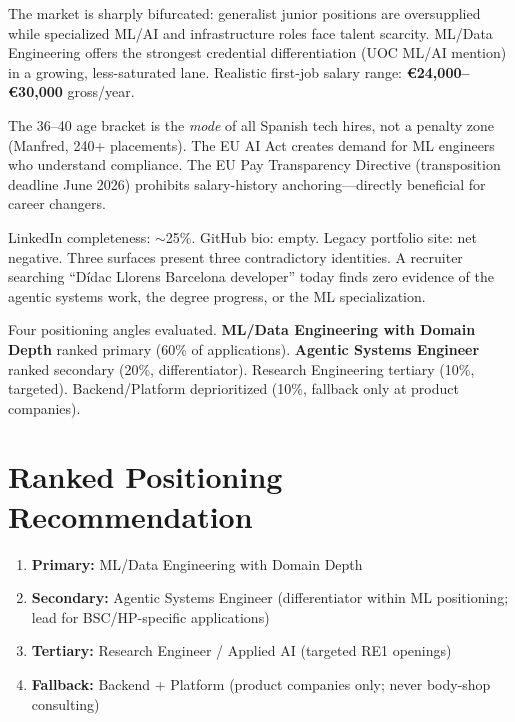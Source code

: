 \documentclass[a4paper,11pt,openany]{report}
\begin{document}
\begin{description}[style=nextline]
  \item[T1 --- Barcelona IT Job Market]
    The market is sharply bifurcated: generalist junior positions are
    oversupplied while specialized ML/AI and infrastructure roles face talent
    scarcity. ML/Data Engineering offers the strongest credential
    differentiation (UOC ML/AI mention) in a growing, less-saturated lane.
    Realistic first-job salary range: \textbf{€24,000--€30,000} gross/year.

  \item[T2 --- Social, Press \& Legal Landscape]
    The 36--40 age bracket is the \emph{mode} of all Spanish tech hires, not a
    penalty zone (Manfred, 240+ placements). The EU AI Act creates demand for
    ML engineers who understand compliance. The EU Pay Transparency Directive
    (transposition deadline June 2026) prohibits salary-history anchoring---directly
    beneficial for career changers.

  \item[T3 --- Profile Audit]
    LinkedIn completeness: $\sim$25\%. GitHub bio: empty. Legacy portfolio
    site: net negative. Three surfaces present three contradictory identities.
    A recruiter searching ``Dídac Llorens Barcelona developer'' today finds
    zero evidence of the agentic systems work, the degree progress, or the ML
    specialization.

  \item[T4 --- Positioning Synthesis]
    Four positioning angles evaluated. \textbf{ML/Data Engineering with Domain
    Depth} ranked primary (60\% of applications). \textbf{Agentic Systems
    Engineer} ranked secondary (20\%, differentiator). Research Engineering
    tertiary (10\%, targeted). Backend/Platform deprioritized (10\%, fallback
    only at product companies).
\end{description}

\section{Ranked Positioning Recommendation}

\begin{enumerate}
  \item \textbf{Primary:} ML/Data Engineering with Domain Depth
  \item \textbf{Secondary:} Agentic Systems Engineer (differentiator within
    ML positioning; lead for BSC/HP-specific applications)
  \item \textbf{Tertiary:} Research Engineer / Applied AI (targeted RE1
    openings)
  \item \textbf{Fallback:} Backend + Platform (product companies only; never
    body-shop consulting)
\end{enumerate}
\end{document}
